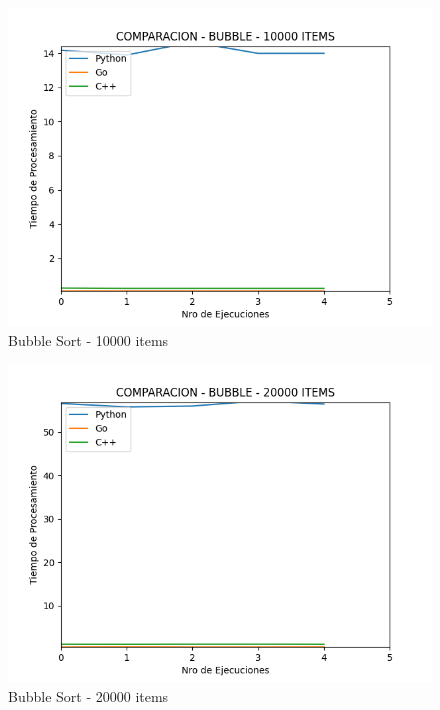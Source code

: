 \documentclass[12pt]{article} %
\begin{document}
    \begin{figure}[H]
    \centering
    \includegraphics[width=\textwidth]{bubble_10000}
    \caption{Bubble Sort - 10000 items}
    \end{figure}

    \vspace{5mm}
    
    \begin{figure}[H]
    \centering
    \includegraphics[width=\textwidth]{bubble_20000}
    \caption{Bubble Sort - 20000 items}
    \end{figure}

    \vspace{5mm}
    
\end{document}
